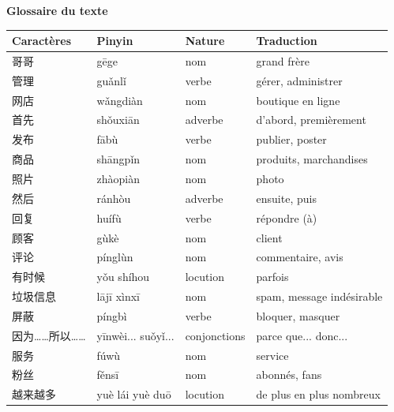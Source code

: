 \documentclass[11pt]{article}
\begin{document}
\textbf{Glossaire du texte}

\begin{center}
\begin{tabularx}{\linewidth}{|X|X|X|X|}
\hline
\rowcolor{popblueL} Caractères & Pinyin & Nature & Traduction \\
\hline
哥哥 & gēge & nom & grand frère \\
\hline
管理 & guǎnlǐ & verbe & gérer, administrer \\
\hline
网店 & wǎngdiàn & nom & boutique en ligne \\
\hline
首先 & shǒuxiān & adverbe & d'abord, premièrement \\
\hline
发布 & fābù & verbe & publier, poster \\
\hline
商品 & shāngpǐn & nom & produits, marchandises \\
\hline
照片 & zhàopiàn & nom & photo \\
\hline
然后 & ránhòu & adverbe & ensuite, puis \\
\hline
回复 & huífù & verbe & répondre (à) \\
\hline
顾客 & gùkè & nom & client \\
\hline
评论 & pínglùn & nom & commentaire, avis \\
\hline
有时候 & yǒu shíhou & locution & parfois \\
\hline
垃圾信息 & lājī xìnxī & nom & spam, message indésirable \\
\hline
屏蔽 & píngbì & verbe & bloquer, masquer \\
\hline
因为……所以…… & yīnwèi... suǒyǐ... & conjonctions & parce que... donc... \\
\hline
服务 & fúwù & nom & service \\
\hline
粉丝 & fěnsī & nom & abonnés, fans \\
\hline
越来越多 & yuè lái yuè duō & locution & de plus en plus nombreux \\
\hline
\end{tabularx}
\end{center}
\end{document}
